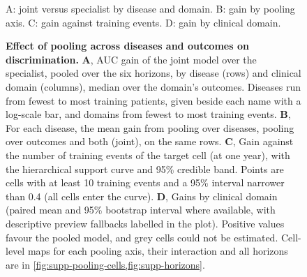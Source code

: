 \begin{figure}[H]
    {A: joint versus specialist by disease and domain. B: gain by pooling axis.
    C: gain against training events. D: gain by clinical domain.}
  \caption{\textbf{Effect of pooling across diseases and outcomes on
  discrimination.} \textbf{A}, AUC gain of the joint model over the
  specialist, pooled over the six horizons, by disease (rows) and clinical
  domain (columns), median over the domain's outcomes. Diseases run from fewest to most training patients, given beside each name with a log-scale bar, and domains from fewest to most training events.
  \textbf{B}, For each disease, the mean gain from pooling
  over diseases, pooling over outcomes and both (joint), on the same rows.
  \textbf{C}, Gain against the number of training events of the target cell
  (at one year),
  with the hierarchical support curve and 95\% credible band. Points are cells
  with at least 10 training events and a 95\% interval narrower than 0.4 (all
  cells enter the curve).  \textbf{D}, Gains
  by clinical domain (paired mean and 95\% bootstrap interval where
  available, with descriptive preview fallbacks labelled in the plot). Positive
  values favour the pooled model, and grey cells could not be estimated.
  Cell-level maps for each pooling axis, their
  interaction and all horizons are in
  \cref{fig:supp-pooling-cells,fig:supp-horizons}.}
  \label{fig:pooling}
\end{figure}


